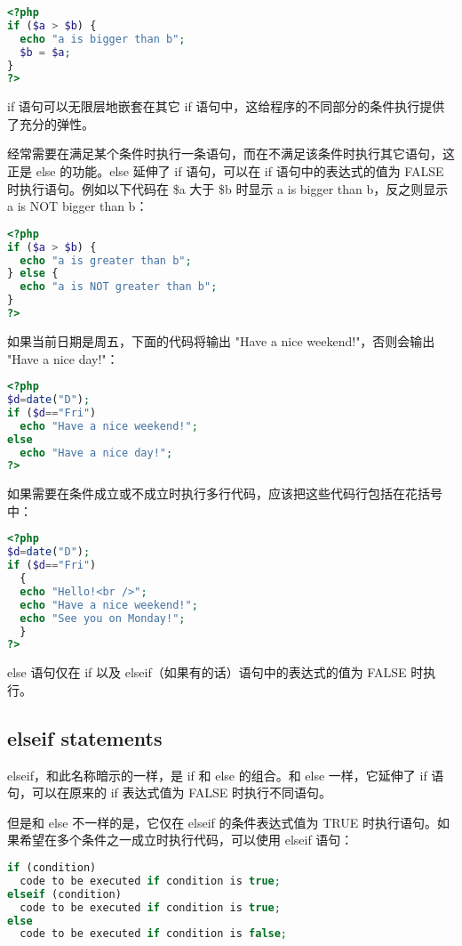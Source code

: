 \begin{lstlisting}[language=PHP]
<?php
if ($a > $b) {
  echo "a is bigger than b";
  $b = $a;
}
?>
\end{lstlisting}

if 语句可以无限层地嵌套在其它 if 语句中，这给程序的不同部分的条件执行提供了充分的弹性。

经常需要在满足某个条件时执行一条语句，而在不满足该条件时执行其它语句，这正是 else 的功能。else 延伸了 if 语句，可以在 if 语句中的表达式的值为 FALSE 时执行语句。例如以下代码在 \$a 大于 \$b 时显示 a is bigger than b，反之则显示 a is NOT bigger than b：


\begin{lstlisting}[language=PHP]
<?php
if ($a > $b) {
  echo "a is greater than b";
} else {
  echo "a is NOT greater than b";
}
?>
\end{lstlisting}

如果当前日期是周五，下面的代码将输出 "Have a nice weekend!"，否则会输出 "Have a nice day!"：


\begin{lstlisting}[language=PHP]
<?php
$d=date("D");
if ($d=="Fri")
  echo "Have a nice weekend!"; 
else
  echo "Have a nice day!"; 
?>
\end{lstlisting}

如果需要在条件成立或不成立时执行多行代码，应该把这些代码行包括在花括号中：

\begin{lstlisting}[language=PHP]
<?php
$d=date("D");
if ($d=="Fri")
  {
  echo "Hello!<br />"; 
  echo "Have a nice weekend!";
  echo "See you on Monday!";
  }
?>
\end{lstlisting}

else 语句仅在 if 以及 elseif（如果有的话）语句中的表达式的值为 FALSE 时执行。


\subsection{elseif statements}

elseif，和此名称暗示的一样，是 if 和 else 的组合。和 else 一样，它延伸了 if 语句，可以在原来的 if 表达式值为 FALSE 时执行不同语句。

但是和 else 不一样的是，它仅在 elseif 的条件表达式值为 TRUE 时执行语句。如果希望在多个条件之一成立时执行代码，可以使用 elseif 语句：

\begin{lstlisting}[language=PHP]
if (condition)
  code to be executed if condition is true;
elseif (condition)
  code to be executed if condition is true;
else
  code to be executed if condition is false; 
\end{lstlisting}

